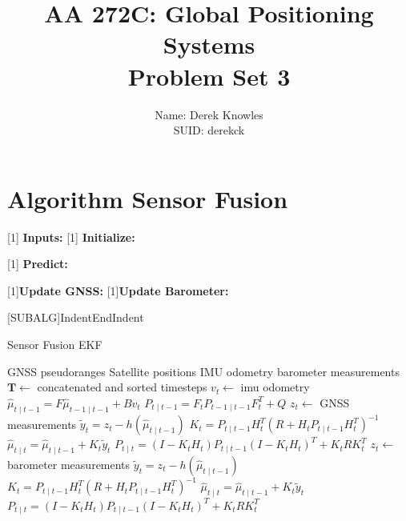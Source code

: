\documentclass{article}
\title{AA 272C: Global Positioning Systems \\ Problem Set 3}
\author{Name: Derek Knowles      \\ SUID: derekck}
\date{}
\begin{document}
\maketitle
\pagestyle{fancy}
\section*{Algorithm Sensor Fusion}


\algnewcommand{\Inputs}[1]{%
  \State \textbf{Inputs:}
}
\algnewcommand{\Initialize}[1]{%
  \State \textbf{Initialize:}
}

\algnewcommand{\Predict}[1]{%
  \State \textbf{Predict:}
}

\algnewcommand{\UpdateGNSS}[1]{\State\textbf{Update GNSS:}}
\algnewcommand{\UpdateBaro}[1]{\State\textbf{Update Barometer:}}

[SUBALG]{Indent}{EndIndent}{}{\algorithmicend\ }%

\begin{algorithm}
	\caption{Sensor Fusion EKF}

	\begin{algorithmic}[1]
        \Inputs{}
            \Indent
            \State GNSS pseudoranges
            \State Satellite positions
            \State IMU odometry
            \State barometer measurements
            \EndIndent
        \Initialize{}
            \Indent
            \State $\mathbf{T} \leftarrow $ concatenated and sorted timesteps
            \EndIndent
                \Predict{}
                \Indent
                \State $ v_t \leftarrow $ imu odometry
                \State $ \hat{\mu}_{t\mid t-1} = F \hat{\mu}_{t-1\mid t-1} + B v_t$
                \State $ P_{t\mid t-1} = F_tP_{t-1\mid t-1}F^T_t+Q$
                \EndIndent
			\EndIf
                \UpdateGNSS{}
                \Indent
                \State $z_t \leftarrow$ GNSS measurements
                \State $\tilde{y}_t = z_t - h(\hat{\mu}_{t\mid t-1})$
                \State $K_t = P_{t\mid t-1} H^T_t(R + H_tP_{t\mid t-1}H^T_t)^{-1}$
                \State $ \hat{\mu}_{t\mid t} =  \hat{\mu}_{t\mid t-1} +K_t \tilde{y}_t$
                \State $ P_{t\mid t} = (I-K_tH_t)P_{t\mid t-1}(I-K_tH_t)^T+K_tRK_t^T$
                \EndIndent
			\EndIf
                \UpdateBaro{}
                \Indent
                \State $z_t \leftarrow$ barometer measurements
                \State $\tilde{y}_t = z_t - h(\hat{\mu}_{t\mid t-1})$
                \State $K_t = P_{t\mid t-1} H^T_t(R + H_tP_{t\mid t-1}H^T_t)^{-1}$
                \State $ \hat{\mu}_{t\mid t} =  \hat{\mu}_{t\mid t-1} +K_t \tilde{y}_t$
                \State $ P_{t\mid t} = (I-K_tH_t)P_{t\mid t-1}(I-K_tH_t)^T+K_tRK_t^T$
                \EndIndent
			\EndIf
		\EndFor
	\end{algorithmic}
\end{algorithm}
\end{document}
